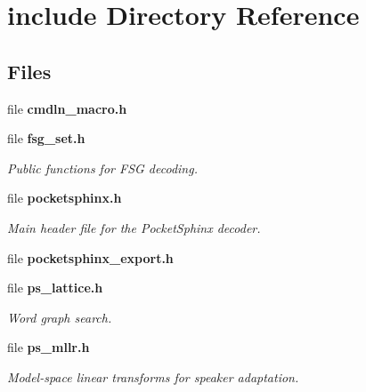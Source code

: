 \section{include Directory Reference}
\label{dir_d44c64559bbebec7f509842c48db8b23}
\subsection*{Files}
\begin{DoxyCompactItemize}
\item 
file {\bfseries cmdln\-\_\-macro.\-h}
\item 
file {\bf fsg\-\_\-set.\-h}
\begin{DoxyCompactList}\small\item\em Public functions for F\-S\-G decoding. \end{DoxyCompactList}\item 
file {\bf pocketsphinx.\-h}
\begin{DoxyCompactList}\small\item\em Main header file for the Pocket\-Sphinx decoder. \end{DoxyCompactList}\item 
file {\bfseries pocketsphinx\-\_\-export.\-h}
\item 
file {\bf ps\-\_\-lattice.\-h}
\begin{DoxyCompactList}\small\item\em Word graph search. \end{DoxyCompactList}\item 
file {\bf ps\-\_\-mllr.\-h}
\begin{DoxyCompactList}\small\item\em Model-\/space linear transforms for speaker adaptation. \end{DoxyCompactList}\end{DoxyCompactItemize}
